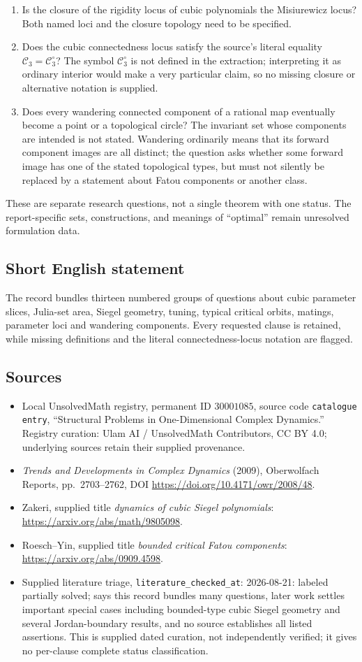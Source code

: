 \documentclass[11pt]{article}
\begin{document}
\begin{enumerate}
\item[16.] Is the closure of the rigidity locus of cubic polynomials the Misiurewicz locus? Both named loci and the closure topology need to be specified.
\item[17.] Does the cubic connectedness locus satisfy the source's literal equality \(\mathcal C_3=\mathcal C_3^\circ\)? The symbol \(\mathcal C_3^\circ\) is not defined in the extraction; interpreting it as ordinary interior would make a very particular claim, so no missing closure or alternative notation is supplied.
\item[18.] Does every wandering connected component of a rational map eventually become a point or a topological circle? The invariant set whose components are intended is not stated. Wandering ordinarily means that its forward component images are all distinct; the question asks whether some forward image has one of the stated topological types, but must not silently be replaced by a statement about Fatou components or another class.
\end{enumerate}
These are separate research questions, not a single theorem with one status. The report-specific sets, constructions, and meanings of ``optimal'' remain unresolved formulation data.
\subsection{Short English statement}
The record bundles thirteen numbered groups of questions about cubic parameter slices, Julia-set area, Siegel geometry, tuning, typical critical orbits, matings, parameter loci and wandering components. Every requested clause is retained, while missing definitions and the literal connectedness-locus notation are flagged.
\subsection{Sources}
\begin{itemize}
\item Local UnsolvedMath registry, permanent ID \(30001085\), source code \texttt{catalogue entry}, ``Structural Problems in One-Dimensional Complex Dynamics.'' Registry curation: Ulam AI / UnsolvedMath Contributors, CC BY 4.0; underlying sources retain their supplied provenance.
\item \emph{Trends and Developments in Complex Dynamics} (2009), Oberwolfach Reports, pp.\ 2703--2762, DOI \url{https://doi.org/10.4171/owr/2008/48}.
\item Zakeri, supplied title \emph{dynamics of cubic Siegel polynomials}: \url{https://arxiv.org/abs/math/9805098}.
\item Roesch--Yin, supplied title \emph{bounded critical Fatou components}: \url{https://arxiv.org/abs/0909.4598}.
\item Supplied literature triage, \texttt{literature\_checked\_at}: 2026-08-21: labeled partially solved; says this record bundles many questions, later work settles important special cases including bounded-type cubic Siegel geometry and several Jordan-boundary results, and no source establishes all listed assertions. This is supplied dated curation, not independently verified; it gives no per-clause complete status classification.
\end{itemize}
\end{document}
